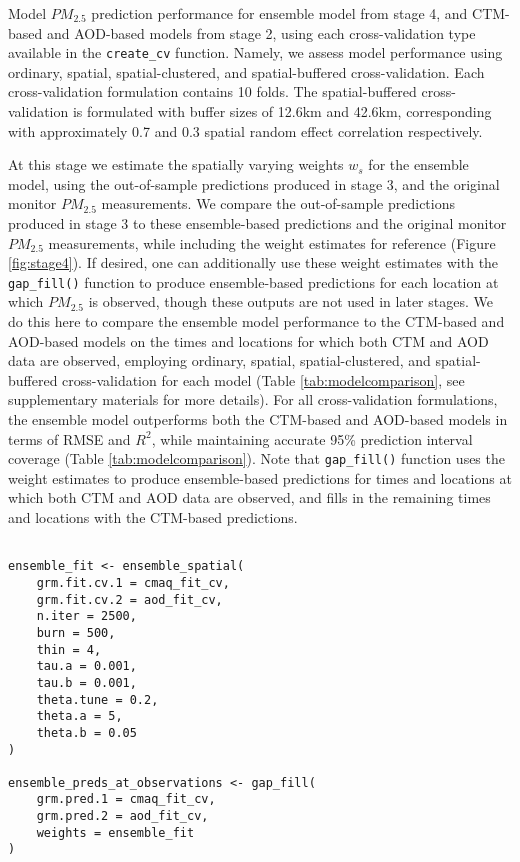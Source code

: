 \documentclass[12pt]{article}
\begin{document}
\begin{table}[ht]
\centering
\caption{
    Model $PM_{2.5}$ prediction performance for ensemble model from stage 4, and CTM-based and AOD-based models from stage 2, using each cross-validation type available in the \texttt{create\_cv} function. 
    Namely, we assess model performance using ordinary, spatial, spatial-clustered, and spatial-buffered cross-validation. Each cross-validation formulation contains 10 folds. The spatial-buffered cross-validation is formulated with buffer sizes of 12.6km and 42.6km, corresponding with approximately 0.7 and 0.3 spatial random effect correlation respectively. 
}
\label{tab:modelcomparison}

\end{table}


At this stage we estimate the spatially varying weights $w_s$ for the ensemble model, using the out-of-sample predictions produced in stage 3, and the original monitor $PM_{2.5}$ measurements.
We compare the out-of-sample predictions produced in stage 3 to these ensemble-based predictions and the original monitor $PM_{2.5}$ measurements, while including the weight estimates for reference (Figure \ref{fig:stage4}).
If desired, one can additionally use these weight estimates with the \texttt{gap\_fill()} function to produce ensemble-based predictions for each location at which $PM_{2.5}$ is observed, though these outputs are not used in later stages. 
We do this here to compare the ensemble model performance to the CTM-based and AOD-based models on the times and locations for which both CTM and AOD data are observed, employing ordinary, spatial, spatial-clustered, and spatial-buffered cross-validation for each model (Table \ref{tab:modelcomparison}, see supplementary materials for more details). 
For all cross-validation formulations, the ensemble model outperforms both the CTM-based and AOD-based models in terms of RMSE and $R^2$, while maintaining accurate 95\% prediction interval coverage (Table \ref{tab:modelcomparison}).
Note that \texttt{gap\_fill()} function uses the weight estimates to produce ensemble-based predictions for times and locations at which both CTM and AOD data are observed, and fills in the remaining times and locations with the CTM-based predictions.

\begin{lstlisting}

ensemble_fit <- ensemble_spatial(
    grm.fit.cv.1 = cmaq_fit_cv,
    grm.fit.cv.2 = aod_fit_cv,
    n.iter = 2500,
    burn = 500,
    thin = 4,
    tau.a = 0.001,
    tau.b = 0.001,
    theta.tune = 0.2,
    theta.a = 5,
    theta.b = 0.05
)

ensemble_preds_at_observations <- gap_fill(
    grm.pred.1 = cmaq_fit_cv,
    grm.pred.2 = aod_fit_cv,
    weights = ensemble_fit
)

\end{lstlisting}
\end{document}
